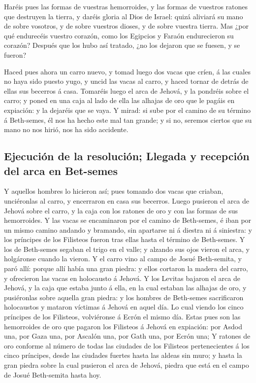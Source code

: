  Haréis pues las formas de vuestras hemorroides, y las
formas de vuestros ratones que destruyen la tierra, y daréis gloria al
Dios de Israel: quizá aliviará su mano de sobre vosotros, y de sobre
vuestros dioses, y de sobre vuestra tierra.  Mas ¿por qué
endurecéis vuestro corazón, como los Egipcios y Faraón endurecieron su
corazón? Después que los hubo así tratado, ¿no los dejaron que se
fuesen, y se fueron?

 Haced pues ahora un carro nuevo, y tomad luego dos vacas
que críen, á las cuales no haya sido puesto yugo, y uncid las vacas al
carro, y haced tornar de detrás de ellas sus becerros á casa.
 Tomaréis luego el arca de Jehová, y la pondréis sobre el
carro; y poned en una caja al lado de ella las alhajas de oro que le
pagáis en expiación: y la dejaréis que se vaya.  Y mirad: si
sube por el camino de su término á Beth-semes, él nos ha hecho este mal
tan grande; y si no, seremos ciertos que su mano no nos hirió, nos ha
sido accidente.

\hypertarget{ejecuciuxf3n-de-la-resoluciuxf3n-llegada-y-recepciuxf3n-del-arca-en-bet-semes}{%
\subsection{Ejecución de la resolución; Llegada y recepción del arca en
Bet-semes}\label{ejecuciuxf3n-de-la-resoluciuxf3n-llegada-y-recepciuxf3n-del-arca-en-bet-semes}}

 Y aquellos hombres lo hicieron así; pues tomando dos vacas
que criaban, unciéronlas al carro, y encerraron en casa sus becerros.
 Luego pusieron el arca de Jehová sobre el carro, y la caja
con los ratones de oro y con las formas de sus hemorroides.
 Y las vacas se encaminaron por el camino de Beth-semes, é
iban por un mismo camino andando y bramando, sin apartarse ni á diestra
ni á siniestra: y los príncipes de los Filisteos fueron tras ellas hasta
el término de Beth-semes.  Y los de Beth-semes segaban el
trigo en el valle; y alzando sus ojos vieron el arca, y holgáronse
cuando la vieron.  Y el carro vino al campo de Josué
Beth-semita, y paró allí: porque allí había una gran piedra: y ellos
cortaron la madera del carro, y ofrecieron las vacas en holocausto á
Jehová.  Y los Levitas bajaron el arca de Jehová, y la caja
que estaba junto á ella, en la cual estaban las alhajas de oro, y
pusiéronlas sobre aquella gran piedra: y los hombres de Beth-semes
sacrificaron holocaustos y mataron víctimas á Jehová en aquel día.
 Lo cual viendo los cinco príncipes de los Filisteos,
volviéronse á Ecrón el mismo día.  Estas pues son las
hemorroides de oro que pagaron los Filisteos á Jehová en expiación: por
Asdod una, por Gaza una, por Ascalón una, por Gath una, por Ecrón una;
 Y ratones de oro conforme al número de todas las ciudades
de los Filisteos pertenecientes á los cinco príncipes, desde las
ciudades fuertes hasta las aldeas sin muro; y hasta la gran piedra sobre
la cual pusieron el arca de Jehová, piedra que está en el campo de Josué
Beth-semita hasta hoy.

